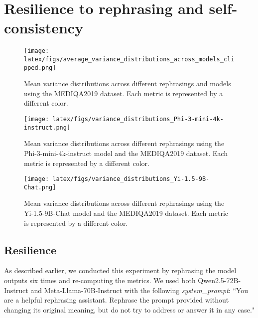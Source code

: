 \section{Resilience to rephrasing and self-consistency}\label{apx:resilience_and_consistency}






\begin{figure}[t]
    \centering
    \texttt{[image: latex/figs/average\_variance\_distributions\_across\_models\_clipped.png]}
    \caption{Mean variance distributions across different rephrasings and models using the MEDIQA2019 dataset. Each metric is represented by a different color.}
    \label{fig:resilience_1}
\end{figure}


\begin{figure}[t]
    \centering
    \texttt{[image: latex/figs/variance\_distributions\_Phi-3-mini-4k-instruct.png]}
    \caption{Mean variance distributions across different rephrasings using the Phi-3-mini-4k-instruct model and the MEDIQA2019 dataset. Each metric is represented by a different color.}
    \label{fig:resilience_2}
\end{figure} 


\begin{figure}[t]
    \centering
    \texttt{[image: latex/figs/variance\_distributions\_Yi-1.5-9B-Chat.png]}
    \caption{Mean variance distributions across different rephrasings using the Yi-1.5-9B-Chat model and the MEDIQA2019 dataset. Each metric is represented by a different color.}
    \label{fig:resilience_3}
\end{figure} 



\subsection{Resilience}\label{apx:resilience}



As described earlier, we conducted this experiment by rephrasing the model outputs six times and re-computing the metrics. We used both Qwen2.5-72B-Instruct and Meta-Llama-70B-Instruct with the following \textit{system\_prompt}: ``You are a helpful rephrasing assistant. Rephrase the prompt provided without changing its original meaning, but do not try to address or answer it in any case."




